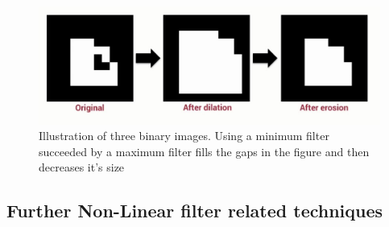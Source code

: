 \documentclass[twoside,a4paper,article]{combine}
\begin{document}
\begin{figure}[H]
    \centering
    \includegraphics[width=0.5\linewidth]{minmax2.PNG}
    \caption{Illustration of three binary images. Using a minimum filter succeeded by a maximum filter fills the gaps in the figure and then decreases it's size}
    \label{fig:enter-label}
\end{figure}
\subsection{Further Non-Linear filter related techniques}
\end{document}
